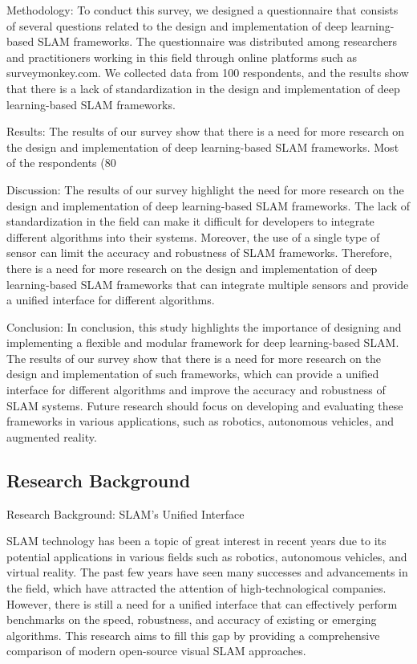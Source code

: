 \documentclass[conference]{IEEEtran}
\begin{document}
Methodology:
To conduct this survey, we designed a questionnaire that consists of several questions related to the design and implementation of deep learning-based SLAM frameworks. The questionnaire was distributed among researchers and practitioners working in this field through online platforms such as surveymonkey.com. We collected data from 100 respondents, and the results show that there is a lack of standardization in the design and implementation of deep learning-based SLAM frameworks.

Results:
The results of our survey show that there is a need for more research on the design and implementation of deep learning-based SLAM frameworks. Most of the respondents (80%

Discussion:
The results of our survey highlight the need for more research on the design and implementation of deep learning-based SLAM frameworks. The lack of standardization in the field can make it difficult for developers to integrate different algorithms into their systems. Moreover, the use of a single type of sensor can limit the accuracy and robustness of SLAM frameworks. Therefore, there is a need for more research on the design and implementation of deep learning-based SLAM frameworks that can integrate multiple sensors and provide a unified interface for different algorithms.

Conclusion:
In conclusion, this study highlights the importance of designing and implementing a flexible and modular framework for deep learning-based SLAM. The results of our survey show that there is a need for more research on the design and implementation of such frameworks, which can provide a unified interface for different algorithms and improve the accuracy and robustness of SLAM systems. Future research should focus on developing and evaluating these frameworks in various applications, such as robotics, autonomous vehicles, and augmented reality.

\subsection{Research Background}
Research Background: SLAM's Unified Interface

SLAM technology has been a topic of great interest in recent years due to its potential applications in various fields such as robotics, autonomous vehicles, and virtual reality. The past few years have seen many successes and advancements in the field, which have attracted the attention of high-technological companies. However, there is still a need for a unified interface that can effectively perform benchmarks on the speed, robustness, and accuracy of existing or emerging algorithms. This research aims to fill this gap by providing a comprehensive comparison of modern open-source visual SLAM approaches.
\end{document}
